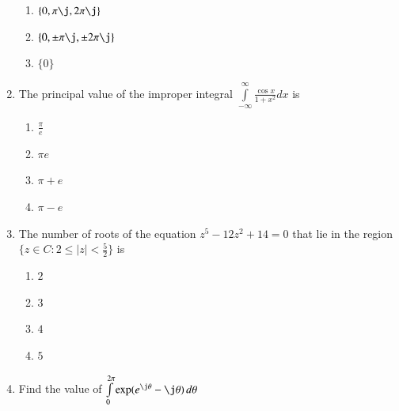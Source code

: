 \documentclass[journal,12pt,twocolumn]{IEEEtran}
\begin{document}
\begin{enumerate}[1.]
\begin{enumerate}
\item $
\lbrace 0, \pi \j, 2 \pi \j \rbrace
$

\item $
\lbrace 0, \pm \pi \j, \pm 2 \pi \j \rbrace
$

\item $
\lbrace 0 \rbrace
$


\end{enumerate}


\item The principal value of the improper integral $\int\limits_{-\infty}^{\infty} \frac{\cos x}{1+x^2} dx $ is

\begin{enumerate}

\item $
\frac{\pi}{e}
$

\item $
\pi e
$

\item $
\pi + e
$

\item $
\pi - e
$

\end{enumerate}

\item The number of roots of the equation $z^5-12z^2+14=0$ that lie in the region 
$ \lbrace z \in C : 2 \leq \mid z \mid < \frac{5}{2} \rbrace $ is

\begin{enumerate}

\item $
2
$

\item $
3
$

\item $
4
$

\item $
5
$

\end{enumerate} 




\item Find the value of $\int\limits_{0}^{2 \pi} \exp ( e^{\j \theta} - \j \theta) \,d \theta $ 


%
%
%
%
%


\end{enumerate}
\end{document}
